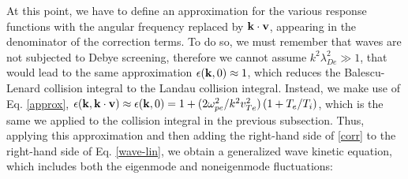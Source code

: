 \documentclass[12pt,a4paper,ruledheader]{report}
\begin{document}
At this point, we have to define an approximation for the various response
functions with the angular frequency replaced by ${\bf k \cdot v}$,
appearing in the denominator of the correction terms. To do so, we must
remember that waves are not subjected to Debye screening, therefore we
cannot assume $k^2\lambda_{De}^2\gg 1$, that would lead to the same
approximation $\epsilon({\bf k},0) \approx 1 $, which reduces the
Balescu-Lenard collision integral to the Landau collision integral.
Instead, we make use of Eq. \eqref{approx}, $\epsilon({\bf k},{\bf k \cdot v})\approx
\epsilon({\bf k},0) = 1+(2 \omega_{pe}^2/k^2v_{Te}^2)\left( 1+T_e/T_i \right)$,
which is the same we applied to the collision integral in the previous
subsection. Thus, applying this approximation and then adding the
right-hand side of \eqref{corr} to the right-hand side of Eq.
\eqref{wave-lin}, we obtain a generalized wave kinetic equation,
which includes both the eigenmode and noneigenmode fluctuations:
\end{document}
